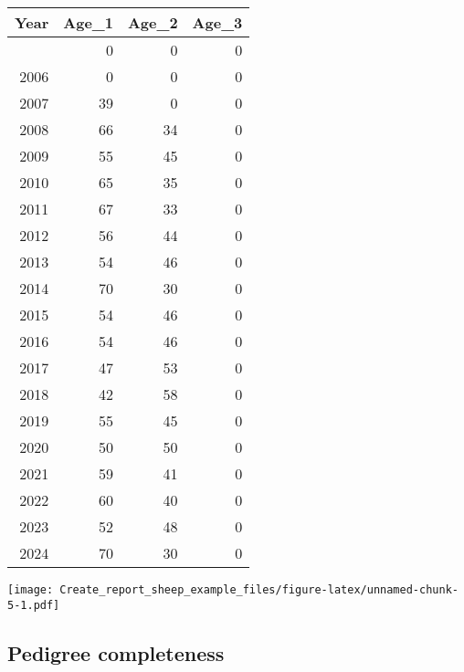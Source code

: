 \documentclass[
]{article}
\newenvironment{Shaded}{\begin{snugshade}}{\end{snugshade}}
\newcommand{\FunctionTok}[1]{\textcolor[rgb]{0.13,0.29,0.53}{\textbf{#1}}}
\newcommand{\NormalTok}[1]{#1}
\newcommand{\SpecialCharTok}[1]{\textcolor[rgb]{0.81,0.36,0.00}{\textbf{#1}}}
\begin{document}
\begin{longtable}[]{@{}rrrr@{}}
\toprule\noalign{}
Year & Age\_1 & Age\_2 & Age\_3 \\
\midrule\noalign{}
\endhead
\bottomrule\noalign{}
\endlastfoot
2005 & 0 & 0 & 0 \\
2006 & 0 & 0 & 0 \\
2007 & 39 & 0 & 0 \\
2008 & 66 & 34 & 0 \\
2009 & 55 & 45 & 0 \\
2010 & 65 & 35 & 0 \\
2011 & 67 & 33 & 0 \\
2012 & 56 & 44 & 0 \\
2013 & 54 & 46 & 0 \\
2014 & 70 & 30 & 0 \\
2015 & 54 & 46 & 0 \\
2016 & 54 & 46 & 0 \\
2017 & 47 & 53 & 0 \\
2018 & 42 & 58 & 0 \\
2019 & 55 & 45 & 0 \\
2020 & 50 & 50 & 0 \\
2021 & 59 & 41 & 0 \\
2022 & 60 & 40 & 0 \\
2023 & 52 & 48 & 0 \\
2024 & 70 & 30 & 0 \\
\end{longtable}

\begin{Shaded}
\end{Shaded}

\texttt{[image: Create\_report\_sheep\_example\_files/figure-latex/unnamed-chunk-5-1.pdf]}

\subsection{Pedigree completeness}\label{pedigree-completeness}

\begin{Shaded}
\end{Shaded}
\end{document}
